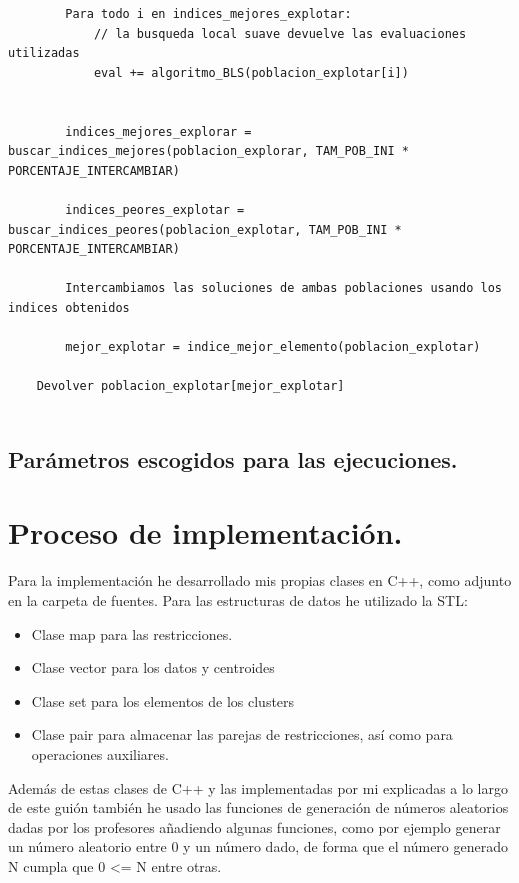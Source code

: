 \documentclass[12pt, spanish]{article}
\begin{document}
\begin{lstlisting}
		Para todo i en indices_mejores_explotar:
			// la busqueda local suave devuelve las evaluaciones utilizadas			
			eval += algoritmo_BLS(poblacion_explotar[i])
			
			
		indices_mejores_explorar = buscar_indices_mejores(poblacion_explorar, TAM_POB_INI * PORCENTAJE_INTERCAMBIAR)
		
		indices_peores_explotar = buscar_indices_peores(poblacion_explotar, TAM_POB_INI * PORCENTAJE_INTERCAMBIAR)
		
		Intercambiamos las soluciones de ambas poblaciones usando los indices obtenidos
		
		mejor_explotar = indice_mejor_elemento(poblacion_explotar)

	Devolver poblacion_explotar[mejor_explotar]
			
\end{lstlisting}


\subsection{Parámetros escogidos para las ejecuciones.}





\section{Proceso de implementación.}

Para la implementación he desarrollado mis propias clases en C++, como adjunto en la carpeta de fuentes. Para las estructuras de datos he utilizado la STL:

\begin{itemize}
	\item Clase map para las restricciones.
	\item Clase vector para los datos y centroides
	\item Clase set para los elementos de los clusters
	\item Clase pair para almacenar las parejas de restricciones, así como para operaciones auxiliares.
\end{itemize}

Además de estas clases de C++ y las implementadas por mi explicadas a lo largo de este guión también he usado las funciones de generación de números aleatorios dadas por los profesores añadiendo algunas funciones, como por ejemplo generar un número aleatorio entre 0 y un número dado, de forma que el número generado N cumpla que 0 <= N entre otras.
\end{document}

